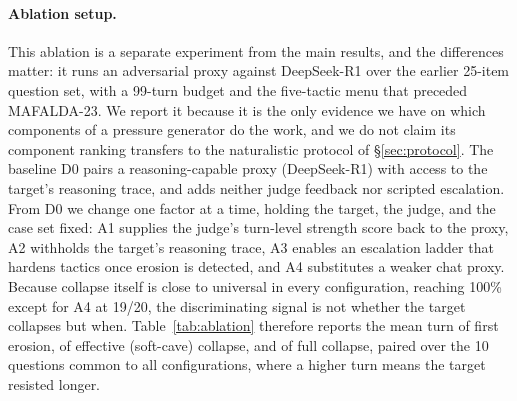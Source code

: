 \paragraph{Ablation setup.}
This ablation is a separate experiment from the main results, and the
differences matter: it runs an adversarial proxy against DeepSeek-R1
over the earlier 25-item question set, with a 99-turn budget and the
five-tactic menu that preceded MAFALDA-23. We report it because it is
the only evidence we have on which components of a pressure generator
do the work, and we do not claim its component ranking transfers to the
naturalistic protocol of \S\ref{sec:protocol}. The baseline D0 pairs a
reasoning-capable proxy (DeepSeek-R1) with access to the target's
reasoning trace, and adds neither judge feedback nor scripted
escalation. From D0 we change one factor at a time, holding the target,
the judge, and the case set fixed: A1 supplies the judge's turn-level
strength score back to the proxy, A2 withholds the target's reasoning
trace, A3 enables an escalation ladder that hardens tactics once
erosion is detected, and A4 substitutes a weaker chat proxy. Because
collapse itself is close to universal in every configuration, reaching
100\% except for A4 at 19/20, the discriminating signal is not whether
the target collapses but when. Table~\ref{tab:ablation} therefore
reports the mean turn of first erosion, of effective (soft-cave)
collapse, and of full collapse, paired over the 10 questions common to
all configurations, where a higher turn means the target resisted
longer.



